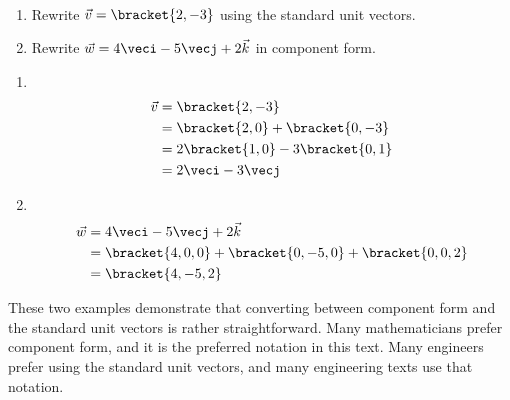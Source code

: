 \begin{example}\label{ex_vect7}
\mbox{}\\[-2\baselineskip]
\begin{enumerate}
	\item Rewrite $\vec v =\bracket{2,-3}$ using the standard unit vectors.
	\item	Rewrite $\vec w = 4\veci - 5\vecj +2\vec k$ in component form.
\end{enumerate}
\solution
\begin{enumerate}
	\item  \mbox{}\\[-2\baselineskip]
	\begin{align*}
		\vec v &=\bracket{2,-3}\\
		&=\bracket{2,0}+\bracket{0,-3}\\
		&= 2\bracket{1,0}-3\bracket{0,1}\\
		&= 2\veci - 3\vecj
	\end{align*}
	
	\item	\mbox{}\\[-2\baselineskip]
	\begin{align*}
		\vec w &= 4\veci - 5\vecj +2\vec k\\
		&=\bracket{4,0,0}+\bracket{0,-5,0}+\bracket{0,0,2}\\
		&=\bracket{4,-5,2}
	\end{align*}
\end{enumerate}
These two examples demonstrate that converting between component form and the standard unit vectors is rather straightforward. Many mathematicians prefer component form, and it is the preferred notation in this text. Many engineers prefer using the standard unit vectors, and many engineering texts use that notation.
\end{example}


